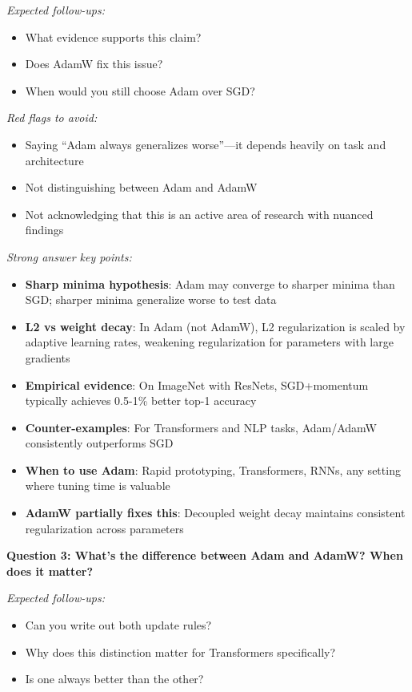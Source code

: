 \documentclass[../../main.tex]{subfiles}
\begin{document}
\begin{interviewquestions}
\textit{Expected follow-ups:}
\begin{itemize}
    \item What evidence supports this claim?
    \item Does AdamW fix this issue?
    \item When would you still choose Adam over SGD?
\end{itemize}

\textit{Red flags to avoid:}
\begin{itemize}
    \item Saying ``Adam always generalizes worse''---it depends heavily on task and architecture
    \item Not distinguishing between Adam and AdamW
    \item Not acknowledging that this is an active area of research with nuanced findings
\end{itemize}

\textit{Strong answer key points:}
\begin{itemize}
    \item \textbf{Sharp minima hypothesis}: Adam may converge to sharper minima than SGD; sharper minima generalize worse to test data
    \item \textbf{L2 vs weight decay}: In Adam (not AdamW), L2 regularization is scaled by adaptive learning rates, weakening regularization for parameters with large gradients
    \item \textbf{Empirical evidence}: On ImageNet with ResNets, SGD+momentum typically achieves 0.5-1\% better top-1 accuracy
    \item \textbf{Counter-examples}: For Transformers and NLP tasks, Adam/AdamW consistently outperforms SGD
    \item \textbf{When to use Adam}: Rapid prototyping, Transformers, RNNs, any setting where tuning time is valuable
    \item \textbf{AdamW partially fixes this}: Decoupled weight decay maintains consistent regularization across parameters
\end{itemize}

\vspace{0.5em}
\textbf{Question 3: What's the difference between Adam and AdamW? When does it matter?}

\textit{Expected follow-ups:}
\begin{itemize}
    \item Can you write out both update rules?
    \item Why does this distinction matter for Transformers specifically?
    \item Is one always better than the other?
\end{itemize}


\end{interviewquestions}
\end{document}
